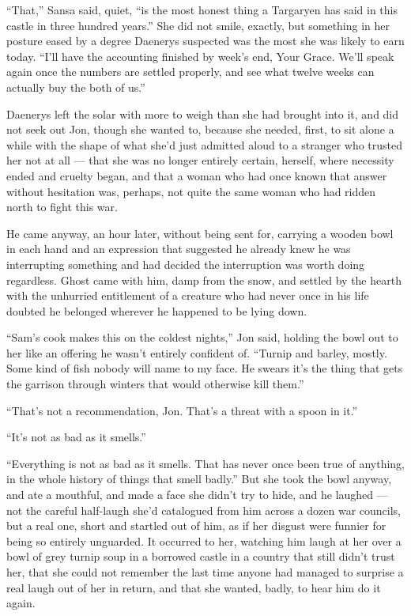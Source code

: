 “That,” Sansa said, quiet, “is the most honest thing a Targaryen has said in this castle in three hundred years.” She did not smile, exactly, but something in her posture eased by a degree Daenerys suspected was the most she was likely to earn today. “I’ll have the accounting finished by week’s end, Your Grace. We’ll speak again once the numbers are settled properly, and see what twelve weeks can actually buy the both of us.”

\sceneBreak

Daenerys left the solar with more to weigh than she had brought into it, and did not seek out Jon, though she wanted to, because she needed, first, to sit alone a while with the shape of what she’d just admitted aloud to a stranger who trusted her not at all — that she was no longer entirely certain, herself, where necessity ended and cruelty began, and that a woman who had once known that answer without hesitation was, perhaps, not quite the same woman who had ridden north to fight this war.

\sceneBreak

He came anyway, an hour later, without being sent for, carrying a wooden bowl in each hand and an expression that suggested he already knew he was interrupting something and had decided the interruption was worth doing regardless. Ghost came with him, damp from the snow, and settled by the hearth with the unhurried entitlement of a creature who had never once in his life doubted he belonged wherever he happened to be lying down.

“Sam’s cook makes this on the coldest nights,” Jon said, holding the bowl out to her like an offering he wasn’t entirely confident of. “Turnip and barley, mostly. Some kind of fish nobody will name to my face. He swears it’s the thing that gets the garrison through winters that would otherwise kill them.”

“That’s not a recommendation, Jon. That’s a threat with a spoon in it.”

“It’s not as bad as it smells.”

“Everything is not as bad as it smells. That has never once been true of anything, in the whole history of things that smell badly.” But she took the bowl anyway, and ate a mouthful, and made a face she didn’t try to hide, and he laughed — not the careful half-laugh she’d catalogued from him across a dozen war councils, but a real one, short and startled out of him, as if her disgust were funnier for being so entirely unguarded. It occurred to her, watching him laugh at her over a bowl of grey turnip soup in a borrowed castle in a country that still didn’t trust her, that she could not remember the last time anyone had managed to surprise a real laugh out of her in return, and that she wanted, badly, to hear him do it again.

